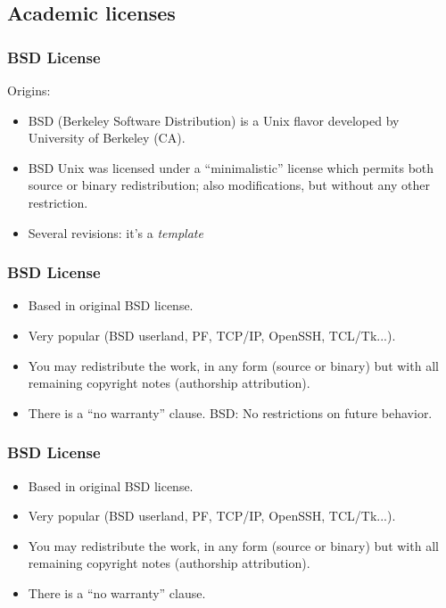 \subsection{Academic licenses}

\begin{frame}
\frametitle{BSD License}

Origins:
\begin{itemize}
\item BSD (Berkeley Software Distribution) is a Unix flavor developed
  by University of Berkeley (CA).
\item BSD Unix was licensed under a ``minimalistic'' license which
  permits both source or binary redistribution; also modifications,
  but without any other restriction.
\item Several revisions: it's a \textit{template}
\end{itemize}

\end{frame}



\begin{frame}
\frametitle{BSD License}

\begin{itemize}
\item Based in original BSD license.
\item Very popular (BSD userland, PF, TCP/IP, OpenSSH, TCL/Tk...).
\item You may redistribute the work, in any form (source or binary)
  but with all remaining copyright notes (authorship attribution).
\item There is a ``no warranty'' clause. 
BSD: No restrictions on future behavior. 
\end{itemize}

\end{frame}


\begin{frame}
\frametitle{BSD License}

\begin{itemize}
\item Based in original BSD license.
\item Very popular (BSD userland, PF, TCP/IP, OpenSSH, TCL/Tk...).
\item You may redistribute the work, in any form (source or binary)
  but with all remaining copyright notes (authorship attribution).
\item There is a ``no warranty'' clause. 
\end{itemize}

\end{frame}

